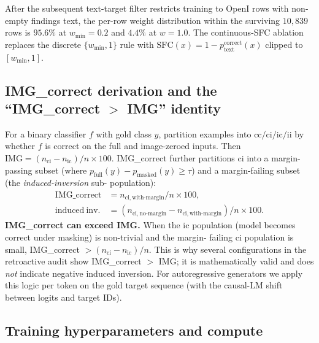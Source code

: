 \documentclass{article}
\begin{document}
After the subsequent text-target filter restricts training to OpenI rows
with non-empty findings text, the per-row weight distribution within
the surviving $10{,}839$ rows is $95.6\%$ at $w_{\min} = 0.2$ and
$4.4\%$ at $w = 1.0$. The continuous-SFC ablation replaces the discrete
$\{w_{\min}, 1\}$ rule with $\mathrm{SFC}(x) = 1 - p_{\mathrm{text}}^{\mathrm{correct}}(x)$
clipped to $[w_{\min}, 1]$.

\subsection{IMG\_correct derivation and the ``IMG\_correct $>$ IMG'' identity}
\label{app:imgcorrect}

For a binary classifier $f$ with gold class $y$, partition examples into
$\mathrm{cc}/\mathrm{ci}/\mathrm{ic}/\mathrm{ii}$ by whether $f$ is
correct on the full and image-zeroed inputs. Then
$\mathrm{IMG} = (n_{\mathrm{ci}} - n_{\mathrm{ic}})/n \times 100$.
IMG\_correct further partitions $\mathrm{ci}$ into a margin-passing
subset (where $p_{\mathrm{full}}(y) - p_{\mathrm{masked}}(y) \geq \tau$)
and a margin-failing subset (the \emph{induced-inversion} sub-
population):
\begin{align*}
\mathrm{IMG\_correct} &= n_{\mathrm{ci,with\text{-}margin}}/n \times 100,\\
\mathrm{induced\ inv.} &= (n_{\mathrm{ci,no\text{-}margin}} -
                            n_{\mathrm{ci,with\text{-}margin}})/n \times 100.
\end{align*}
\textbf{IMG\_correct can exceed IMG.} When the $\mathrm{ic}$ population
(model becomes correct under masking) is non-trivial and the margin-
failing $\mathrm{ci}$ population is small, IMG\_correct
$> (n_{\mathrm{ci}} - n_{\mathrm{ic}})/n$. This is why several
configurations in the retroactive audit show
IMG\_correct $>$ IMG; it is mathematically valid and does \emph{not}
indicate negative induced inversion. For autoregressive generators we
apply this logic per token on the gold target sequence (with the
causal-LM shift between logits and target IDs).

\subsection{Training hyperparameters and compute}
\label{app:training}
\end{document}
